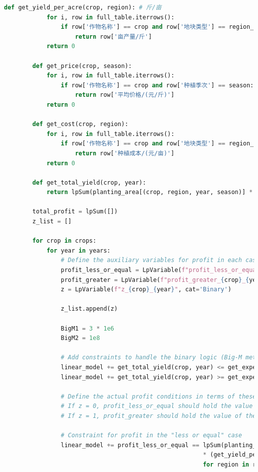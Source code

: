 \documentclass{cumcmthesis}
\begin{document}
\begin{appendices}
\begin{lstlisting}[language=python]
        def get_yield_per_acre(crop, region): # 斤/亩
            for i, row in full_table.iterrows():
                if row['作物名称'] == crop and row['地块类型'] == region_to_type[region]:
                    return row['亩产量/斤']
            return 0
        
        def get_price(crop, season):
            for i, row in full_table.iterrows():
                if row['作物名称'] == crop and row['种植季次'] == season:
                    return row['平均价格/(元/斤)']
            return 0
    
        def get_cost(crop, region):
            for i, row in full_table.iterrows():
                if row['作物名称'] == crop and row['地块类型'] == region_to_type[region]:
                    return row['种植成本/(元/亩)']
            return 0
        
        def get_total_yield(crop, year):
            return lpSum(planting_area[(crop, region, year, season)] * get_yield_per_acre(crop, region) for region in regions for season in seasons)
    
        total_profit = lpSum([])
        z_list = []
    
        for crop in crops:
            for year in years:
                # Define the auxiliary variables for profit in each case
                profit_less_or_equal = LpVariable(f"profit_less_or_equal_{crop}_{year}")
                profit_greater = LpVariable(f"profit_greater_{crop}_{year}")
                z = LpVariable(f"z_{crop}_{year}", cat='Binary')
    
                z_list.append(z)
    
                BigM1 = 3 * 1e6
                BigM2 = 1e8
    
                # Add constraints to handle the binary logic (Big-M method)
                linear_model += get_total_yield(crop, year) <= get_expected_sales(crop, '第一季') + get_expected_sales(crop, '第二季') + BigM1 * (1 - z)
                linear_model += get_total_yield(crop, year) >= get_expected_sales(crop, '第一季') + get_expected_sales(crop, '第二季') - BigM1 * z
    
                # Define the actual profit conditions in terms of these auxiliary variables
                # If z = 0, profit_less_or_equal should hold the value of the first branch
                # If z = 1, profit_greater should hold the value of the second branch
    
                # Constraint for profit in the "less or equal" case
                linear_model += profit_less_or_equal == lpSum(planting_area[(crop, region, year, season)]
                                                        * (get_yield_per_acre(crop, region) * get_price(crop, season) - get_cost(crop, region))
                                                        for region in regions for season in seasons)
    

\end{lstlisting}
\end{appendices}
\end{document}
